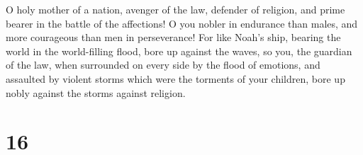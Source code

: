  O holy mother of a nation, avenger of the law, defender of
religion, and prime bearer in the battle of the affections!
 O you nobler in endurance than males, and more courageous
than men in perseverance!  For like Noah's ship, bearing
the world in the world-filling flood, bore up against the waves,
 so you, the guardian of the law, when surrounded on every
side by the flood of emotions, and assaulted by violent storms which
were the torments of your children, bore up nobly against the storms
against religion.

\hypertarget{section-15}{%
\section{16}\label{section-15}}

